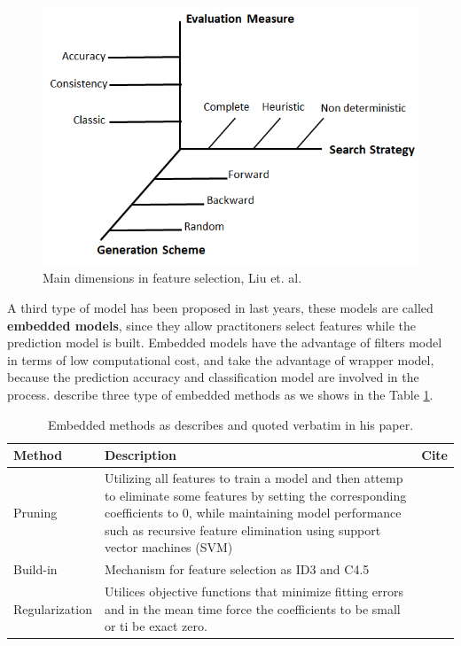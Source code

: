\documentclass[]{book}
\begin{document}
\begin{figure}[H]

{\centering \includegraphics[width=0.6\linewidth]{images/main-dimensions-in-feature-selection} 

}

\caption{Main dimensions in feature selection, Liu et. al.}\label{fig:main-dimensions-dr}
\end{figure}

A third type of model has been proposed in last years, these models are
called \textbf{embedded models}, since they allow practitoners select
features while the prediction model is built. Embedded models have the
advantage of filters model in terms of low computational cost, and take
the advantage of wrapper model, because the prediction accuracy and
classification model are involved in the process. \citep{Tang2014}
describe three type of embedded methods as we shows in the Table
\ref{tab:table-embedded-methods}.

\begin{table}[h]
\centering
\caption{Embedded methods as \cite{Tang2014} describes and quoted verbatim in his paper.}
\label{tab:table-embedded-methods}
\begin{tabular}{|>{\centering\arraybackslash}p{3cm}|>{\arraybackslash}p{10cm}|>{\centering\arraybackslash}p{2cm}|}
\hline Method & Description & Cite \\ 
\hline Pruning & Utilizing all features to train a model and then attemp to eliminate some features by setting the corresponding coefficients to 0, while maintaining model performance such as recursive feature elimination using support vector machines (SVM) & \cite{Guyon2002} \\ 
\hline Build-in & Mechanism for feature selection as ID3 and C4.5 & \cite{Quinlan1986,Quinlan1993} \\ 
\hline Regularization & Utilices objective functions that minimize fitting errors and in the mean time force the coefficients to be small or ti be exact zero. & \cite{Ma2008} \\ 
\hline 
\end{tabular} 
\end{table}
\end{document}
